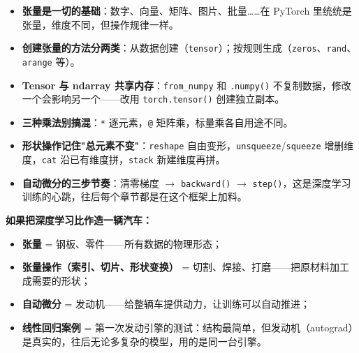 \documentclass[a4paper,11pt]{ctexart}
\begin{document}
\begin{itemize}
    \item \textbf{张量是一切的基础}：数字、向量、矩阵、图片、批量……在 PyTorch 里统统是张量，维度不同，但操作规律一样。
    \item \textbf{创建张量的方法分两类}：从数据创建（\texttt{tensor}）；按规则生成（\texttt{zeros}、\texttt{rand}、\texttt{arange} 等）。
    \item \textbf{Tensor 与 ndarray 共享内存}：\texttt{from\_numpy} 和 \texttt{.numpy()} 不复制数据，修改一个会影响另一个——改用 \texttt{torch.tensor()} 创建独立副本。
    \item \textbf{三种乘法别搞混}：\texttt{*} 逐元素，\texttt{@} 矩阵乘，标量乘各自用途不同。
    \item \textbf{形状操作记住"总元素不变"}：\texttt{reshape} 自由变形，\texttt{unsqueeze}/\texttt{squeeze} 增删维度，\texttt{cat} 沿已有维度拼，\texttt{stack} 新建维度再拼。
    \item \textbf{自动微分的三步节奏}：清零梯度 $\to$ \texttt{backward()} $\to$ \texttt{step()}，这是深度学习训练的心跳，往后每个章节都是在这个框架上加料。
\end{itemize}

\begin{metaphorbox}[给零基础读者的一句总比喻]
    \textbf{如果把深度学习比作造一辆汽车：}
    \begin{itemize}
        \item \textbf{张量} = 钢板、零件——所有数据的物理形态；
        \item \textbf{张量操作（索引、切片、形状变换）} = 切割、焊接、打磨——把原材料加工成需要的形状；
        \item \textbf{自动微分} = 发动机——给整辆车提供动力，让训练可以自动推进；
        \item \textbf{线性回归案例} = 第一次发动引擎的测试：结构最简单，但发动机（autograd）是真实的，往后无论多复杂的模型，用的是同一台引擎。
    \end{itemize}
\end{metaphorbox}
\end{document}
